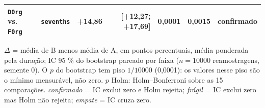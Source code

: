 \begin{table}[t]
\begin{tabular}{llrrrrl}
    \texttt{D0rg} vs. \texttt{F0rg} & \texttt{sevenths} & +14,86 & [+12,27; +17,69] & 0,0001 & 0,0015 & confirmado \\
    \bottomrule
  \end{tabular}
  \vspace{2pt}
  \parbox{\linewidth}{\footnotesize $\Delta$ = média de B menos média de A, em pontos percentuais, média ponderada pela duração; IC 95 \% do bootstrap pareado por faixa ($n = 10000$ reamostragens, semente 0). O $p$ do bootstrap tem piso $1/10000$ (0,0001): os valores nesse piso são o mínimo mensurável, não zero. $p$ Holm: Holm--Bonferroni sobre as 15 comparações. \emph{confirmado} = IC exclui zero e Holm rejeita; \emph{frágil} = IC exclui zero mas Holm não rejeita; \emph{empate} = IC cruza zero.}
\end{table}
